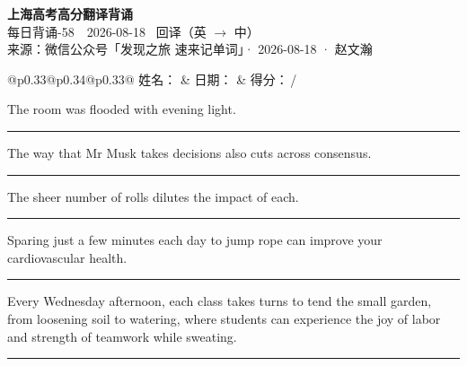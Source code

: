 \documentclass[11pt,a4paper]{article}
\newcommand{\num}[1]{\makebox[1.9em][r]{#1.}\hspace{0.3em}}
\newcommand{\wline}{\noindent\rule{\linewidth}{0.4pt}}
\begin{document}
\pagestyle{plain}
\begin{center}
{\LARGE\bfseries 上海高考高分翻译背诵 }\\[0.25em]
{\large 每日背诵-58　2026-08-18 \quad\ 回译（英 $\to$ 中）}\\[0.35em]
{\footnotesize 来源：微信公众号「发现之旅 速来记单词」· 2026-08-18 · 赵文瀚}
\end{center}

\vspace{0.4em}
\noindent\begin{tabular}{@{}p{0.33\textwidth}@{}p{0.34\textwidth}@{}p{0.33\textwidth}@{}}
姓名：\underline{\hspace{2.0cm}} & 日期：\underline{\hspace{2.0cm}} & 得分：\underline{\hspace{1.4cm}}\,/ \\
\end{tabular}

\vspace{0.5em}

\vspace{0.8em}
\num{1}The room was flooded with evening light.

\vspace{0.25em}

\wline

\num{2}The way that Mr Musk takes decisions also cuts across consensus.

\vspace{0.25em}

\wline

\num{3}The sheer number of rolls dilutes the impact of each.

\vspace{0.25em}

\wline

\num{4}Sparing just a few minutes each day to jump rope can improve your cardiovascular health.

\vspace{0.25em}

\wline

\num{5}Every Wednesday afternoon, each class takes turns to tend the small garden, from loosening soil to watering, where students can experience the joy of labor and strength of teamwork while sweating.

\vspace{0.25em}

\wline
\end{document}
